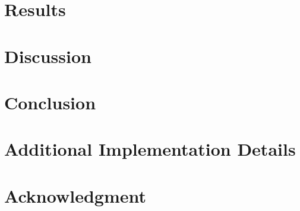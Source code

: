 \documentclass[journal]{IEEEtran}
\begin{document}
\section{Results}

\section{Discussion}

\section{Conclusion}

\appendices
\section{Additional Implementation Details}

\section*{Acknowledgment}

\ifCLASSOPTIONcaptionsoff
  \newpage
\fi
\end{document}
